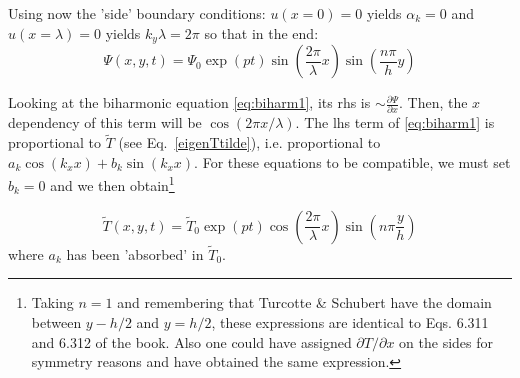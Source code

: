 Using now the 'side' boundary conditions:
$u(x=0)=0$ yields $\alpha_k=0$ and $u(x=\lambda)=0$ yields $k_y \lambda = 2\pi$
so that in the end:
\begin{equation}
\boxed{
\Psi(x,y,t) = 
\Psi_0 \exp(pt) 
\sin \left(\frac{2\pi}{\lambda} x \right) 
\sin \left(\frac{n \pi }{h}y \right)
}
\label{eq:psi2}
\end{equation}





Looking at the biharmonic equation \eqref{eq:biharm1}, its rhs is $\sim \frac{\partial \Psi}{\partial x}$.
Then, the $x$ dependency of this term will be $\cos(2 \pi x / \lambda)$.
The lhs term of \eqref{eq:biharm1} is proportional to $\tilde{T}$ (see Eq.~\eqref{eigenTtilde}), i.e. proportional to $ a_k \cos (k_x x) + b_k \sin (k_x x)$.
For these equations to be compatible, we must set $b_k=0$ and we then obtain\footnote{
Taking $n=1$ and remembering that Turcotte \& Schubert have the domain between 
$y-h/2$ and $y=h/2$, these expressions are identical to Eqs. 6.311 and 6.312 
of the book. Also one could have assigned $\partial T/\partial x$ on the sides
for symmetry reasons and have obtained the same expression.
}

\begin{equation}
\boxed{
\tilde{T}(x,y,t) = 
\tilde{T}_0 \exp(pt) 
\cos \left( \frac{2\pi}{\lambda} x \right) 
\sin \left(n\pi \frac{y}{h} \right)
}
\label{eq:Ttilde2}
\end{equation}
where $a_k$ has been 'absorbed' in $\tilde{T}_0$.








